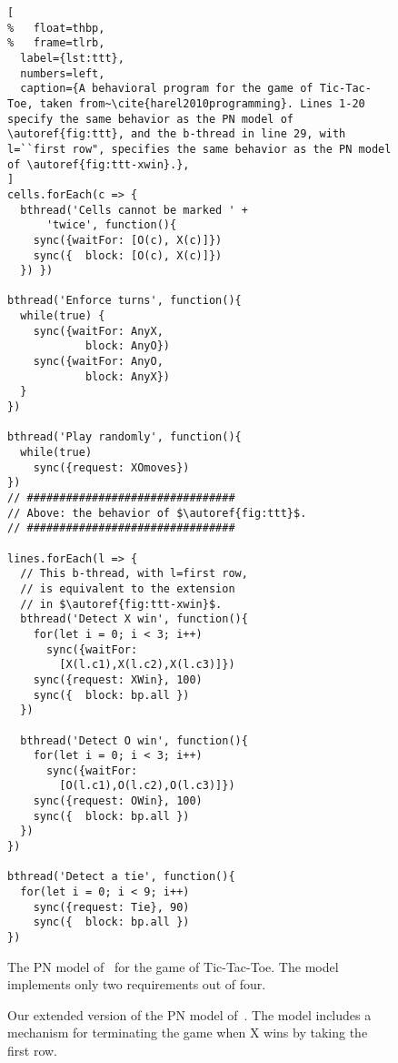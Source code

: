 \documentclass[10pt,journal,compsoc]{IEEEtran}
\theoremstyle{definition}
\begin{document}
\begin{figure*}
\begin{minipage}[b]{0.37\textwidth}
\centering
\begin{lstlisting}[
%   float=thbp,
%   frame=tlrb,
  label={lst:ttt},
  numbers=left,
  caption={A behavioral program for the game of Tic-Tac-Toe, taken from~\cite{harel2010programming}. Lines 1-20 specify the same behavior as the PN model of \autoref{fig:ttt}, and the b-thread in line 29, with l=``first row", specifies the same behavior as the PN model of \autoref{fig:ttt-xwin}.},
]
cells.forEach(c => {
  bthread('Cells cannot be marked ' + 
      'twice', function(){
    sync({waitFor: [O(c), X(c)]})
    sync({  block: [O(c), X(c)]})
  }) })
  
bthread('Enforce turns', function(){
  while(true) {
    sync({waitFor: AnyX, 
            block: AnyO})
    sync({waitFor: AnyO, 
            block: AnyX})
  }
})

bthread('Play randomly', function(){
  while(true)
    sync({request: XOmoves})
})
// ################################
// Above: the behavior of $\autoref{fig:ttt}$.
// ################################

lines.forEach(l => {
  // This b-thread, with l=first row,
  // is equivalent to the extension 
  // in $\autoref{fig:ttt-xwin}$.
  bthread('Detect X win', function(){
    for(let i = 0; i < 3; i++)
      sync({waitFor: 
        [X(l.c1),X(l.c2),X(l.c3)]})
    sync({request: XWin}, 100)
    sync({  block: bp.all })
  })
  
  bthread('Detect O win', function(){
    for(let i = 0; i < 3; i++)
      sync({waitFor:
        [O(l.c1),O(l.c2),O(l.c3)]})
    sync({request: OWin}, 100)
    sync({  block: bp.all })
  })
})

bthread('Detect a tie', function(){
  for(let i = 0; i < 9; i++)
    sync({request: Tie}, 90)
    sync({  block: bp.all })
})
\end{lstlisting}
\end{minipage}
\quad
\begin{minipage}[b]{0.6\textwidth}
\centering
    {}
    \caption{The PN model of~\cite{PetriNetDSLblahchain} for the game of Tic-Tac-Toe. The model implements only two requirements out of four.}
    \label{fig:ttt}\vspace{13ex}
  
    {}
    \caption{Our extended version of the PN model of~\cite{PetriNetDSLblahchain}. The model includes a mechanism for terminating the game when X wins by taking the first row.}
    \label{fig:ttt-xwin}\vspace{6em}\vspace{-2pt}
\end{minipage}
\end{figure*}



\end{document}
